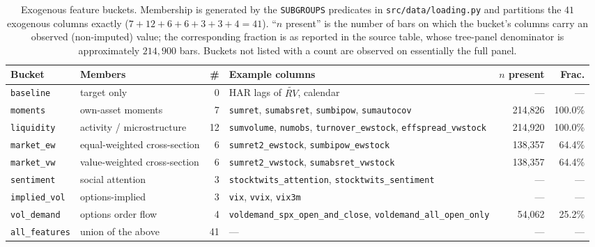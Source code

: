 \begin{table}[H]
\centering
\caption{Exogenous feature buckets. Membership is generated by the
\texttt{SUBGROUPS} predicates in \texttt{src/data/loading.py} and partitions the
$41$ exogenous columns exactly ($7+12+6+6+3+3+4 = 41$). ``$n$ present'' is the
number of bars on which the bucket's columns carry an observed (non-imputed)
value; the corresponding fraction is as reported in the source table, whose
tree-panel denominator is approximately $214{,}900$ bars. Buckets not listed with
a count are observed on essentially the full panel.}
\label{tab:desc_buckets}
\begin{tabular}{llrp{4.6cm}rr}
\toprule
Bucket & Members & \# & Example columns & $n$ present & Frac. \\
\midrule
\texttt{baseline}     & target only & 0  & HAR lags of $\widetilde{RV}$, calendar & --- & --- \\
\texttt{moments}      & own-asset moments & 7  & \texttt{sumret}, \texttt{sumabsret}, \texttt{sumbipow}, \texttt{sumautocov} & 214{,}826 & 100.0\% \\
\texttt{liquidity}    & activity / microstructure & 12 & \texttt{sumvolume}, \texttt{numobs}, \texttt{turnover\_ewstock}, \texttt{effspread\_vwstock} & 214{,}920 & 100.0\% \\
\texttt{market\_ew}   & equal-weighted cross-section & 6  & \texttt{sumret2\_ewstock}, \texttt{sumbipow\_ewstock} & 138{,}357 & 64.4\% \\
\texttt{market\_vw}   & value-weighted cross-section & 6  & \texttt{sumret2\_vwstock}, \texttt{sumabsret\_vwstock} & 138{,}357 & 64.4\% \\
\texttt{sentiment}    & social attention & 3  & \texttt{stocktwits\_attention}, \texttt{stocktwits\_sentiment} & --- & --- \\
\texttt{implied\_vol} & options-implied & 3  & \texttt{vix}, \texttt{vvix}, \texttt{vix3m} & --- & --- \\
\texttt{vol\_demand}  & options order flow & 4  & \texttt{voldemand\_spx\_open\_and\_close}, \texttt{voldemand\_all\_open\_only} & 54{,}062 & 25.2\% \\
\midrule
\texttt{all\_features} & union of the above & 41 & --- & --- & --- \\
\bottomrule
\end{tabular}
\end{table}

